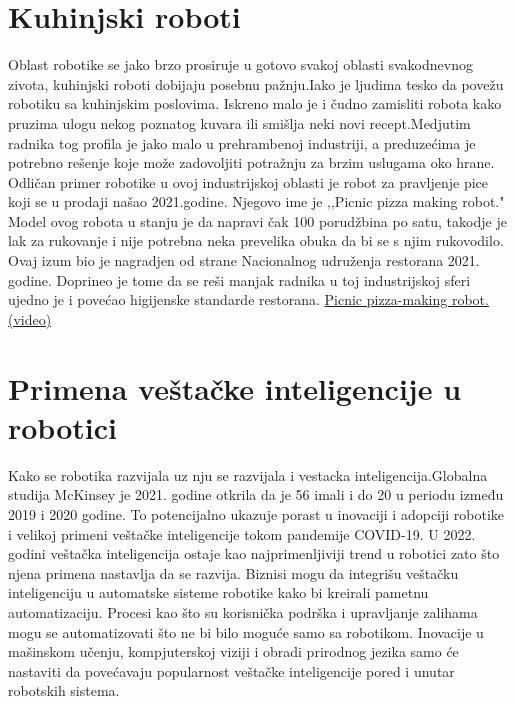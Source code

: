 \documentclass{report}
\begin{document}
\chapter{Kuhinjski roboti}
Oblast robotike se jako brzo prosiruje u gotovo svakoj oblasti svakodnevnog zivota, kuhinjski roboti dobijaju posebnu pažnju.Iako je ljudima tesko da povežu robotiku sa kuhinjskim poslovima. Iskreno malo je i čudno zamisliti robota kako pruzima ulogu nekog poznatog kuvara ili smišlja neki novi recept.Medjutim radnika tog profila je jako malo u prehrambenoj industriji, a preduzećima je potrebno rešenje koje može zadovoljiti potražnju za brzim uslugama oko hrane. Odličan primer robotike u ovoj industrijskoj oblasti je robot za pravljenje pice koji se u prodaji našao 2021.godine. Njegovo ime je ,,Picnic pizza making robot." Model ovog robota u stanju je da napravi čak 100 porudžbina po satu, takodje je lak za rukovanje i nije potrebna neka prevelika obuka da bi se s njim rukovodilo. Ovaj izum bio je nagradjen od strane Nacionalnog udruženja restorana 2021. godine. Doprineo je tome da se reši manjak radnika u toj industrijskoj sferi ujedno je i povećao higijenske standarde restorana.
\href{https://www.youtube.com/embed/_dCC96BOlDU}{Picnic pizza-making robot. (video)}
\chapter{Primena veštačke inteligencije u robotici}
Kako se robotika razvijala uz nju se razvijala i vestacka inteligencija.Globalna studija McKinsey je 2021. godine
otkrila da je 56%
imali i do 20%
u periodu između 2019 i 2020 godine. To potencijalno ukazuje porast u inovaciji i adopciji robotike i velikoj primeni veštačke inteligencije tokom pandemije COVID-19. U 2022. godini veštačka inteligencija ostaje kao najprimenljiviji trend u robotici zato što njena primena nastavlja da se razvija. Biznisi mogu da integrišu veštačku inteligenciju u automatske sisteme robotike kako bi
kreirali pametnu automatizaciju. Procesi kao što su korisnička podrška i upravljanje zalihama mogu se  automatizovati što ne bi bilo moguće samo sa robotikom. Inovacije u mašinskom učenju, kompjuterskoj viziji i obradi prirodnog jezika samo će nastaviti da povećavaju popularnost veštačke inteligencije pored i unutar robotskih sistema.
	
\end{document}

